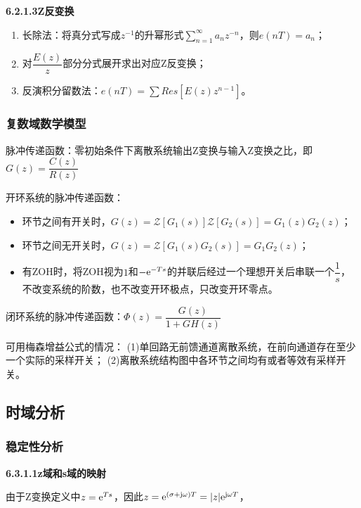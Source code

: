 \documentclass[11pt,a4paper]{ctexart}
\newcommand{\e}{{\rm e}}
\renewcommand{\j}{{\rm j}}
\begin{document}
            {\setlength{\parindent}{0pt}\textbf{6.2.1.3\quad Z反变换}}
                
                \begin{enumerate}
                    \item 长除法：将真分式写成$z^{-1}$的升幂形式$\sum\limits_{n=1}^{\infty}a_nz^{-n}$，则$e(nT)=a_n$；
                    \item 对$\dfrac{E(z)}{z}$部分分式展开求出对应Z反变换；
                    \item 反演积分留数法：$e(nT)=\sum Res[E(z)z^{n-1}]$。
                \end{enumerate}
        \subsubsection{复数域数学模型}
            脉冲传递函数：零初始条件下离散系统输出Z变换与输入Z变换之比，即$G(z)=\dfrac{C(z)}{R(z)}$

            开环系统的脉冲传递函数：
            \begin{itemize}
                \item 环节之间有开关时，$G(z)=\mathscr{Z}[G_1(s)]\mathscr{Z}[G_2(s)]=G_1(z)G_2(z)$；
                \item 环节之间无开关时，$G(z)=\mathscr{Z}[G_1(s)G_2(s)]=G_1G_2(z)$；
                \item 有ZOH时，将ZOH视为$1$和$-\e^{-Ts}$的并联后经过一个理想开关后串联一个$\dfrac1s$，不改变系统的阶数，也不改变开环极点，只改变开环零点。
            \end{itemize}
            
            闭环系统的脉冲传递函数：$\varPhi(z)=\dfrac{G(z)}{1+GH(z)}$

            可用梅森增益公式的情况：
            (1)单回路无前馈通道离散系统，在前向通道存在至少一个实际的采样开关；
            (2)离散系统结构图中各环节之间均有或者等效有采样开关。
    \subsection{时域分析}
        \subsubsection{稳定性分析}
            {\setlength{\parindent}{0pt}\textbf{6.3.1.1\quad z域和s域的映射}}

            由于Z变换定义中$z=\e^{Ts}$，因此$z=\e^{(\sigma+\j\omega)T}=|z|\e^{\j\omega T}$，
\end{document}
